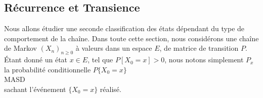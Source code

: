 \subsection{Récurrence et Transience}

Nous allons étudier une seconde classification des états dépendant du type de comportement de la chaîne. Dans toute cette section, nous considérons une chaîne de Markov $(X_n)_{n \geq 0}$ à valeurs dans un espace $E$, de matrice de transition $P$.
\\
Étant donné un état $x \in E$, tel que $P[X_0 = x] > 0$, nous notons simplement $P_x$ la probabilité conditionnelle 
$P\{  X_0 = x\} $ 
\\ MASD \\
sachant l’événement $\{X_0 = x\}$ réalisé.










